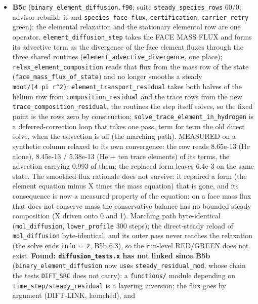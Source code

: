 \documentclass[english,a4paper]{my_memo}
\begin{document}
\begin{itemize}
  by 16:58, and B5\textquotesingle s marching path was measured byte-identical anyway). A
  further \texttt{make\ check} follows FIELD-SELF and B5c.
\item
  \textbf{B5c} (\texttt{binary\_element\_diffusion.f90}; suite \texttt{steady\_species\_rows} 60/0;
  advisor rebuild: it and \texttt{species\_face\_flux}, \texttt{certification},
  \texttt{carrier\_retry} green): the elemental relaxation and the stationary
  elemental row are one operator. \texttt{element\_diffusion\_step} takes the FACE
  MASS FLUX and forms its advective term as the divergence of the face
  element fluxes through the three shared routines
  (\texttt{element\_advective\_divergence}, one place); \texttt{relax\_element\_composition}
  reads that flux from the mass row of the state (\texttt{face\_mass\_flux\_of\_state})
  and no longer smooths a steady \texttt{mdot/(4\ pi\ r\^{}2)}; \texttt{element\_transport\_residual}
  takes both halves of the helium row from \texttt{composition\_residual} and the
  trace rows from the new \texttt{trace\_composition\_residual}, the routines the step
  itself solves, so the fixed point is the row\textquotesingle s zero by construction;
  \texttt{solve\_trace\_element\_in\_hydrogen} is a deferred-correction loop that takes
  one pass, term for term the old direct solve, when the advection is off
  (the marching path). MEASURED on a synthetic column relaxed to its own
  convergence: the row reads 8.65e-13 (He alone), 8.45e-13 / 5.38e-13 (He +
  ten trace elements) of its terms, the advection carrying 0.993 of them;
  the replaced form leaves 6.4e-3 on the same state. The smoothed-flux
  rationale does not survive: it repaired a form (the element equation minus
  X times the mass equation) that is gone, and its consequence is now a
  measured property of the equation: on a face mass flux that does not
  conserve mass the conservative balance has no bounded steady composition
  (X driven onto 0 and 1). Marching path byte-identical (\texttt{mol\_diffusion},
  \texttt{lower\_profile} 300 steps); the direct-steady reload of \texttt{mol\_diffusion}
  byte-identical, and its outer pass never reaches the relaxation (the solve
  ends \texttt{info\ =\ 2}, B5b 6.3), so the run-level RED/GREEN does not exist.
  \textbf{Found: \texttt{diffusion\_tests.x} has not linked since B5b} (\texttt{binary\_element\_diffusion}
  now \texttt{use}s \texttt{steady\_residual\_mod}, whose chain the test\textquotesingle s \texttt{DIFT\_SRC} does not
  carry): a \texttt{functions/} module depending on \texttt{time\_step/steady\_residual} is a
  layering inversion; the flux goes by argument (DIFT-LINK, launched), and

\end{itemize}
\end{document}
